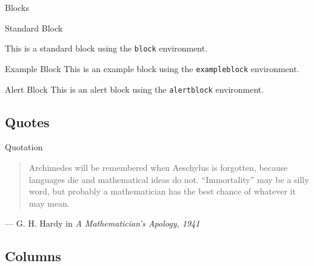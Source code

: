 \documentclass[,]{beamer}
\begin{document}
\begin{frame}{Blocks}
\protect\hypertarget{blocks-1}{}

\begin{block}{Standard Block}

This is a standard block using the \texttt{block} environment.

\end{block}

\begin{exampleblock}{Example Block}
    This is an example block using the \texttt{exampleblock} environment.
\end{exampleblock}

\begin{alertblock}{Alert Block}
    This is an alert block using the \texttt{alertblock} environment.
\end{alertblock}

\end{frame}

\hypertarget{quotes}{%
\subsection{Quotes}\label{quotes}}

\begin{frame}{Quotation}
\protect\hypertarget{quotation}{}

\begin{quote}
Archimedes will be remembered when Aeschylus is forgotten, because
languages die and mathematical ideas do not. ``Immortality'' may be a
silly word, but probably a mathematician has the best chance of whatever
it may mean.
\end{quote}

\hfill --- G. H. Hardy in \emph{A Mathematician's Apology, 1941}

\end{frame}

\hypertarget{columns}{%
\subsection{Columns}\label{columns}}
\end{document}
